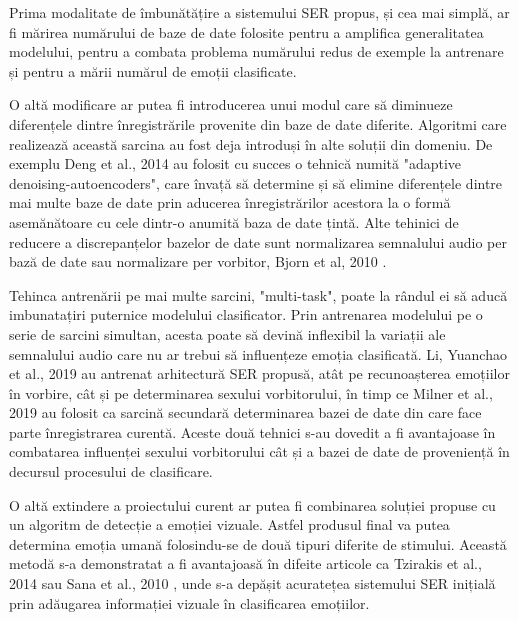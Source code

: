 \documentclass[a4paper,12pt]{book}
\begin{document}
		Prima modalitate de îmbunătățire a sistemului SER propus, și cea mai simplă, ar fi mărirea numărului de baze de date folosite pentru a amplifica generalitatea modelului, pentru a combata problema numărului redus de exemple la antrenare și pentru a mării numărul de emoții clasificate. \par 
		
		O altă modificare ar putea fi introducerea unui modul care să diminueze diferențele dintre înregistrările provenite din baze de date diferite. Algoritmi care realizează această sarcina au fost deja introduși în alte soluții din domeniu. De exemplu Deng et al., 2014 \cite{imbun1} au folosit cu succes o tehnică numită "adaptive denoising-autoencoders", care învață să determine și să elimine diferențele dintre mai multe baze de date prin aducerea înregistrărilor acestora la o formă asemănătoare cu cele dintr-o anumită baza de date țintă. Alte tehinici de reducere a discrepanțelor bazelor de date sunt normalizarea semnalului audio per bază de date sau normalizare per vorbitor, Bjorn et al, 2010 \cite{spnorm}. \par
		Tehinca antrenării pe mai multe sarcini, "multi-task", poate la rândul ei să aducă imbunatațiri puternice modelului clasificator. Prin antrenarea modelului pe o serie de sarcini simultan, acesta poate să devină inflexibil la variații ale semnalului audio care nu ar trebui să influențeze emoția clasificată. Li, Yuanchao et al., 2019 \cite{yuan} au antrenat arhitectură SER propusă, atât pe recunoașterea emoțiilor în vorbire, cât și pe determinarea sexului vorbitorului, în timp ce Milner et al., 2019 \cite{multi-domain} au folosit ca sarcină secundară determinarea bazei de date din care face parte înregistrarea curentă. Aceste două tehnici s-au dovedit a fi avantajoase în combatarea influenței sexului vorbitorului cât și a bazei de date de proveniență în decursul procesului de clasificare.\par 
		O altă extindere a proiectului curent ar putea fi combinarea soluției propuse cu un algoritm de detecție a emoției vizuale. Astfel produsul final va putea determina emoția umană folosindu-se de două tipuri diferite de stimului. Această metodă s-a demonstratat a fi avantajoasă în difeite articole ca Tzirakis et al., 2014 \cite{tzir} sau Sana et al., 2010 \cite{imbun3}, unde s-a depășit acuratețea sistemului SER inițială prin adăugarea informației vizuale în clasificarea emoțiilor. \par		
		
\end{document}
